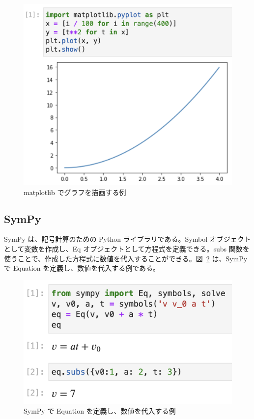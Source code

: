 \begin{figure}[htb]
\centering
\includegraphics[width=0.9\linewidth]{work/example_matplotlib.png}
\caption{matplotlib でグラフを描画する例} \label{example_matplotlib}
\end{figure}

\subsection{SymPy}
SymPy は、記号計算のための Python ライブラリである。Symbol オブジェクトとして変数を作成し、Eq オブジェクトとして方程式を定義できる。subs 関数を使うことで、作成した方程式に数値を代入することができる。図~\ref{example_sympy} は、SymPy で Equation を定義し、数値を代入する例である。

\begin{figure}[bht]
\centering
\includegraphics[width=0.9\linewidth]{work/example_sympy.png}
\caption{SymPy で Equation を定義し、数値を代入する例} \label{example_sympy}
\end{figure}

